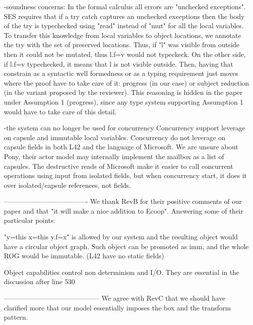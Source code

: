 -soundness concerns:
  In the formal calculus all errors are "unchecked exceptions".
  SES requires that if a try catch captures an unchecked exceptions then the body of the try
is typechecked using "read" instead of "mut" for all the local variables.
  To transfer this knowledge from local variables to object locations, we annotate the try with
the set of preserved locations.
  Thus, if "l" was visible from outside then it could not be mutated, thus l.f=v would not typeckeck.
  On the other side, if l.f=v typechecked, it means that l is not visible outside.
  Then, having that constrain as a syntactic well formedness or as a typing requirement just moves 
where the proof have to take care of it: progress (in our case) or subject reduction
 (in the variant proposed by the reviewer).
  This reasoning is hidden in the paper under Assumption 1 (progress), since any type system
 supporting Assumption 1 would have to take care of this detail.

-the system can no longer be used for concurrency
Concurrency support leverage on capsule and immutable local variables.
Concurrency do not leverage on capsule fields in both L42 and the language of Microsoft.
We are unsure about Pony, their actor model may internally implement the mailbox as a list of capsules.
The destructive reads of Microsoft make it easier to call concurrent operations using input
 from isolated fields, but when concurrency start, it does it over isolated/capsule references, not fields.


-------------------------------------
We thank RevB for their positive comments of our paper and that "it will make a nice addition to Ecoop".
Answering some of their particular points: 

"y=this x=this y.f=x" is allowed by our system and the resulting object would have a circular object graph.
Such object can be promoted as imm, and the whole ROG would be immutable.
(L42 have no static fields)

Object capabilities control non determinism and I/O. They are essential in the discussion after line 530

------------------------------------------
We agree with RevC that we should have clarified more
that our model essentially imposes the box and the transform pattern.


